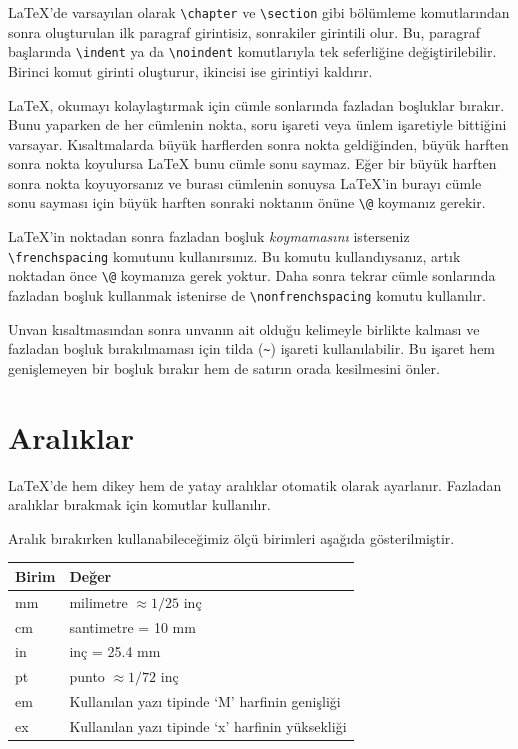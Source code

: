 \documentclass[
  10pt,
]{scrbook}
\begin{document}
LaTeX'de varsayılan olarak \texttt{\textbackslash{}chapter} ve \texttt{\textbackslash{}section} gibi bölümleme
komutlarından sonra oluşturulan ilk paragraf girintisiz, sonrakiler
girintili olur. Bu, paragraf başlarında \texttt{\textbackslash{}indent} ya da \texttt{\textbackslash{}noindent}
komutlarıyla tek seferliğine değiştirilebilir. Birinci komut girinti
oluşturur, ikincisi ise girintiyi kaldırır.

LaTeX, okumayı kolaylaştırmak için cümle sonlarında fazladan boşluklar
bırakır. Bunu yaparken de her cümlenin nokta, soru işareti veya ünlem
işaretiyle bittiğini varsayar. Kısaltmalarda büyük harflerden sonra
nokta geldiğinden, büyük harften sonra nokta koyulursa LaTeX bunu cümle
sonu saymaz. Eğer bir büyük harften sonra nokta koyuyorsanız ve burası
cümlenin sonuysa LaTeX'in burayı cümle sonu sayması için büyük harften
sonraki noktanın önüne \texttt{\textbackslash{}@} koymanız gerekir.

LaTeX'in noktadan sonra fazladan boşluk \emph{koymamasını} isterseniz
\texttt{\textbackslash{}frenchspacing} komutunu kullanırsınız. Bu komutu kullandıysanız, artık
noktadan önce \texttt{\textbackslash{}@} koymanıza gerek yoktur. Daha sonra tekrar cümle
sonlarında fazladan boşluk kullanmak istenirse de \texttt{\textbackslash{}nonfrenchspacing}
komutu kullanılır.

Unvan kısaltmasından sonra unvanın ait olduğu kelimeyle birlikte kalması
ve fazladan boşluk bırakılmaması için tilda (\texttt{\textasciitilde{}}) işareti
kullanılabilir. Bu işaret hem genişlemeyen bir boşluk bırakır hem de
satırın orada kesilmesini önler.

\hypertarget{aralux131klar}{%
\section{Aralıklar}\label{aralux131klar}}

LaTeX'de hem dikey hem de yatay aralıklar otomatik olarak ayarlanır.
Fazladan aralıklar bırakmak için komutlar kullanılır.

Aralık bırakırken kullanabileceğimiz ölçü birimleri aşağıda
gösterilmiştir.

\begin{longtable}[]{@{}ll@{}}
\toprule
Birim & Değer \\
\midrule
\endhead
mm & milimetre \(\approx 1/25\) inç \\
cm & santimetre = 10 mm \\
in & inç = 25.4 mm \\
pt & punto \(\approx 1/72\) inç \\
em & Kullanılan yazı tipinde `M' harfinin genişliği \\
ex & Kullanılan yazı tipinde `x' harfinin yüksekliği \\
\bottomrule
\end{longtable}
\end{document}

